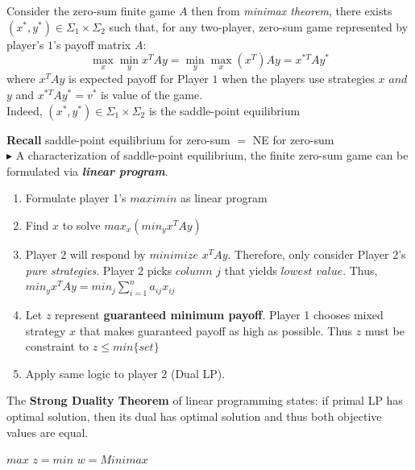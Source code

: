 \documentclass[../Main.tex]{subfiles}
\begin{document}
Consider the zero-sum finite game $A$ then from \textit{minimax theorem}, there exists $(x^*, y^*) \in \Sigma_1 \times \Sigma_2$ such that, for any two-player, zero-sum game represented by player's $1$'s payoff matrix $A$:
\[
    \max_{x} \min_{y} x^T A y = \min_{y} \max_{x} (x^T) A y = x^{*T} A y^*
\]
where  $x^TAy$ is expected payoff for Player $1$ when the players use strategies $x$ $and$ $y$ and $x^{*T}Ay^* = v^*$ is value of the game.\\

Indeed, $(x^*, y^*) \in \Sigma_1 \times \Sigma_2$ is the saddle-point equilibrium

\textbf{Recall} saddle-point equilibrium for zero-sum $=$ NE for zero-sum\\

$\blacktriangleright$ A characterization of saddle-point equilibrium, the finite zero-sum game can be formulated via \textbf{\textit{linear program}}.

\begin{enumerate}
    \item Formulate player 1's $maximin$ as linear program
    \item Find $x$ to solve $max_x(min_yx^TAy)$
    \item Player $2$ will respond by $minimize$ $x^T Ay$. Therefore, only consider Player $2$'s \textit{pure strategies}. Player $2$ picks $column$ $j$ that yields $lowest$ $value$. Thus, $min_yx^TAy = min_j\sum^n_{i=1}a_{ij}x_{ij}$
    \item Let $z$ represent \textbf{guaranteed minimum payoff}. Player 1 chooses mixed strategy $x$ that makes guaranteed payoff as high as possible. Thus $z$ must be constraint to $z \leq min\{set\}$
    \item Apply same logic to player $2$ (Dual LP).
\end{enumerate}

The \textbf{Strong Duality Theorem} of linear programming states: if primal LP has optimal solution, then its dual has optimal solution and thus both objective values are equal.
\begin{center}
    $max$ $z = min$ $w = Minimax$   
\end{center}
\end{document}
